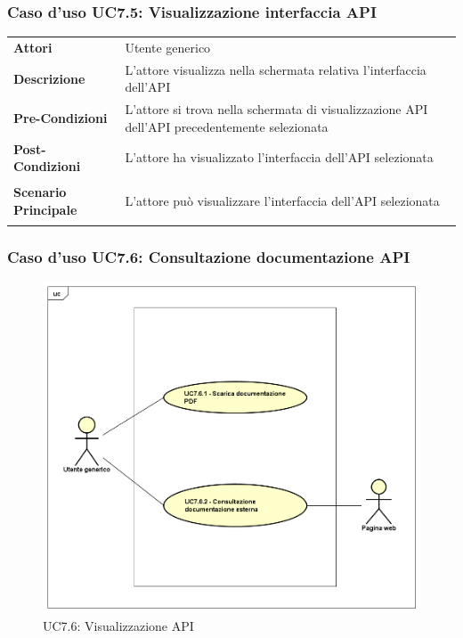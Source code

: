 \subsubsection{Caso d'uso UC7.5: Visualizzazione interfaccia API}
\label{UC7_5}

\begin{minipage}{\linewidth}
	\begin{tabular}{ l | p{11cm}}
		\hline
		\rowcolor{Gray}
		\multicolumn{2}{c}{UC7.5 - Visualizzazione interfaccia API} \\
		\hline
		\textbf{Attori} & Utente generico \\
		\textbf{Descrizione} & L'attore visualizza nella schermata relativa l'interfaccia dell'API \\
		\textbf{Pre-Condizioni} & L'attore si trova nella schermata di visualizzazione API dell'API precedentemente selezionata \\
		\textbf{Post-Condizioni} & L'attore ha visualizzato l'interfaccia dell'API selezionata \\
		\textbf{Scenario Principale} & 
		\begin{enumerate*}[label=(\arabic*.),itemjoin={\newline}]
			\item L'attore può visualizzare l'interfaccia dell'API selezionata
		\end{enumerate*}\\
	\end{tabular}
\end{minipage}

\newpage
\subsubsection{Caso d'uso UC7.6: Consultazione documentazione API}
\label{UC7_6}
\begin{figure}[ht]
	\centering
	\includegraphics[scale=0.45]{UML/UC7_6.png}
	\caption{UC7.6: Visualizzazione API}
\end{figure}

